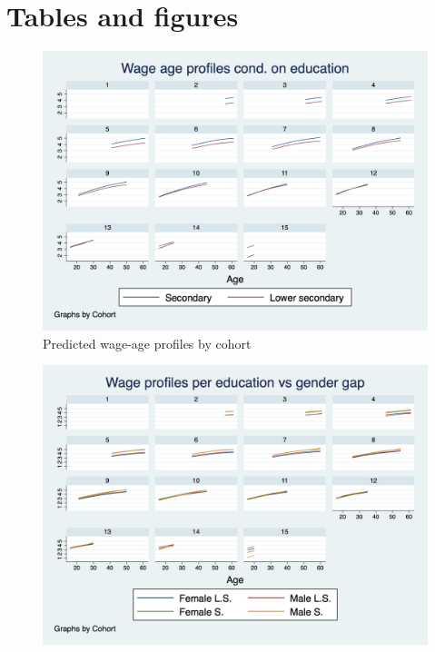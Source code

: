 \documentclass[12pt]{article}
\begin{document}
\section{Tables and figures}
\begin{center}
    
    
    
    
    
    
    
\end{center}

\newpage

\begin{center}
    

\begin{figure}[h]
    \centering
    \includegraphics[scale=0.4]{graph1.png}
    \caption{\label{fig:pred_reg}Predicted wage-age profiles by cohort}
\end{figure}
\begin{figure}[!h]
    \includegraphics[scale=0.4]{graph2.png}

\end{figure}
\end{center}
\end{document}
